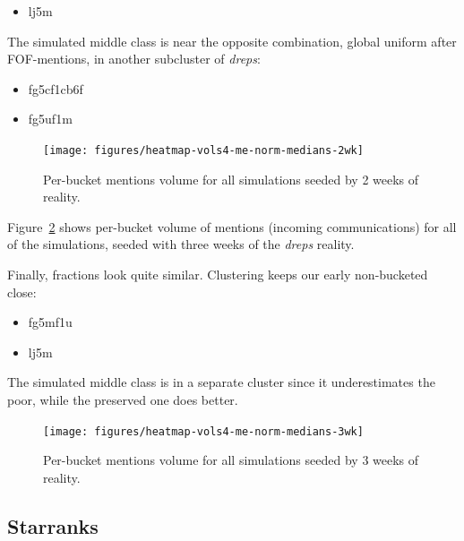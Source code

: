 \documentclass[10pt,oneside]{memoir}
\begin{document}
\begin{Spacing}{2}
\begin{itemize}
\item lj5m
\end{itemize}

The simulated middle class is near the opposite combination, global uniform after FOF-mentions, in another subcluster of {\itshape dreps}:


\begin{itemize}


\item fg5cf1cb6f

\item fg5uf1m
\end{itemize}


\begin{figure}
\begin{center}
    \texttt{[image: figures/heatmap-vols4-me-norm-medians-2wk]}
    \caption{Per-bucket mentions volume for all simulations seeded by 2 weeks of reality.}
    \label{figure:heatmap-vols4-me-norm-medians-2wk}
\end{center}
\end{figure}
Figure~\ref{figure:heatmap-vols4-me-norm-medians-3wk} shows per-bucket volume of mentions (incoming communications) for all of the simulations, seeded with three weeks of the {\itshape dreps} reality.


Finally, fractions look quite similar.  Clustering keeps our early non-bucketed close:


\begin{itemize}


\item fg5mf1u

\item lj5m
\end{itemize}

The simulated middle class is in a separate cluster since it underestimates the poor, while the preserved one does better.



\begin{figure}
\begin{center}
    \texttt{[image: figures/heatmap-vols4-me-norm-medians-3wk]}
    \caption{Per-bucket mentions volume for all simulations seeded by 3 weeks of reality.}
    \label{figure:heatmap-vols4-me-norm-medians-3wk}
\end{center}
\end{figure}
\pagebreak \subsection{Starranks}
\label{starranks}


\end{Spacing}
\end{document}
